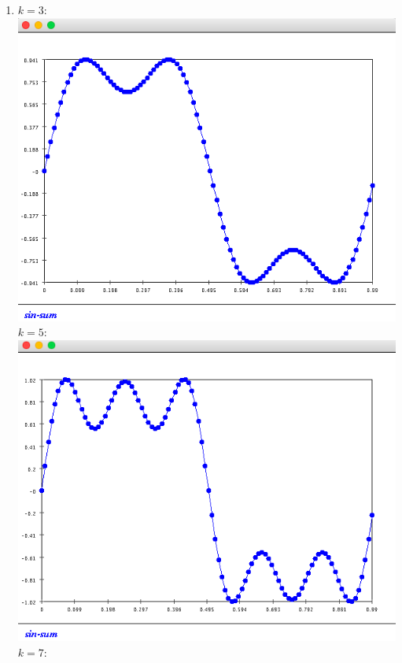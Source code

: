 \documentclass{article}
\begin{document}
\begin{enumerate}
\item $k=3$: \\
\includegraphics[scale=0.3]{exercise5_k3}\\
$k=5$:\\
\includegraphics[scale=0.3]{exercise5_k5}\\
$k=7$:\\

\end{enumerate}
\end{document}

